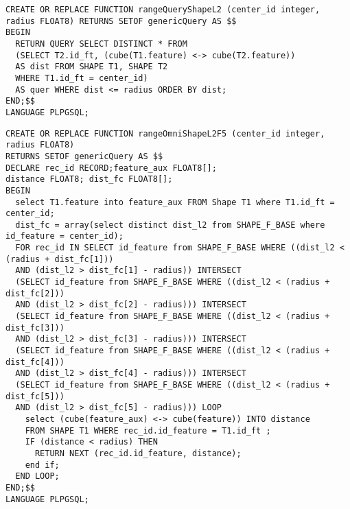 \begin{apendicesenv}
\begin{lstlisting}[caption={Range Query sequencial - L2}, captionpos=t,basicstyle=\tiny]
CREATE OR REPLACE FUNCTION rangeQueryShapeL2 (center_id integer, radius FLOAT8) RETURNS SETOF genericQuery AS $$
BEGIN
  RETURN QUERY SELECT DISTINCT * FROM 
  (SELECT T2.id_ft, (cube(T1.feature) <-> cube(T2.feature)) 
  AS dist FROM SHAPE T1, SHAPE T2 
  WHERE T1.id_ft = center_id) 
  AS quer WHERE dist <= radius ORDER BY dist;
END;$$
LANGUAGE PLPGSQL;
\end{lstlisting}
\newpage
\begin{lstlisting}[caption={Range OMNI com 5 focos - L2}, captionpos=t,basicstyle=\tiny]
CREATE OR REPLACE FUNCTION rangeOmniShapeL2F5 (center_id integer, radius FLOAT8) 
RETURNS SETOF genericQuery AS $$
DECLARE rec_id RECORD;feature_aux FLOAT8[]; 
distance FLOAT8; dist_fc FLOAT8[];
BEGIN
  select T1.feature into feature_aux FROM Shape T1 where T1.id_ft = center_id;
  dist_fc = array(select distinct dist_l2 from SHAPE_F_BASE where id_feature = center_id);
  FOR rec_id IN SELECT id_feature from SHAPE_F_BASE WHERE ((dist_l2 < (radius + dist_fc[1])) 
  AND (dist_l2 > dist_fc[1] - radius)) INTERSECT
  (SELECT id_feature from SHAPE_F_BASE WHERE ((dist_l2 < (radius + dist_fc[2])) 
  AND (dist_l2 > dist_fc[2] - radius))) INTERSECT
  (SELECT id_feature from SHAPE_F_BASE WHERE ((dist_l2 < (radius + dist_fc[3])) 
  AND (dist_l2 > dist_fc[3] - radius))) INTERSECT
  (SELECT id_feature from SHAPE_F_BASE WHERE ((dist_l2 < (radius + dist_fc[4])) 
  AND (dist_l2 > dist_fc[4] - radius))) INTERSECT
  (SELECT id_feature from SHAPE_F_BASE WHERE ((dist_l2 < (radius + dist_fc[5])) 
  AND (dist_l2 > dist_fc[5] - radius))) LOOP
    select (cube(feature_aux) <-> cube(feature)) INTO distance 
    FROM SHAPE T1 WHERE rec_id.id_feature = T1.id_ft ;
    IF (distance < radius) THEN
      RETURN NEXT (rec_id.id_feature, distance);			       
    end if;				
  END LOOP;
END;$$
LANGUAGE PLPGSQL;
\end{lstlisting}

\end{apendicesenv}